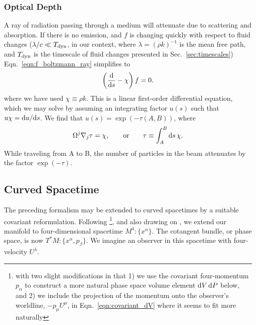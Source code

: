 \subsubsection{Optical Depth}
A ray of radiation passing through a medium will attenuate due to scattering and
absorption. If there is no emission, and $f$ is changing quickly with respect to
fluid changes ($\lambda/c \ll T_{\rm dyn}$, in our context, where
$\lambda=(\rho k)^{-1}$ is the mean free path, and $T_{\rm dyn}$ is the timescale
of fluid changes presented in Sec.~\ref{sec:timescales})
Eqn.~\ref{eqn:f_boltzmann_ray} simplifies to
\begin{equation}
  \left(\frac{\mathrm{d}}{\mathrm{d} s} - \chi\right)f=0.
\end{equation}
where we have used $\chi\equiv\rho k$.
This is a linear first-order differential equation, which we may solve by
assuming an integrating factor $u(s)$ such that $u\chi=\mathrm{d} u/\mathrm{d} s$.
We find that $u(s)=\exp\left(-\tau(A,B)\right)$, where
\begin{equation}
  \label{eqn:tau_flatspace}
  \Omega^j\nabla_j \tau = \chi, \qquad {\rm or} \qquad
  \tau \equiv \int_A^B \mathrm{d} s\, \chi.
\end{equation}
While traveling from A to B, the number of particles in the beam attenuates by
the factor $\exp(-\tau)$.

\subsection{Curved Spacetime}
The preceding formalism may be extended to curved spacetimes by a suitable
covariant reformulation. Following \citet{lind1966-gr_boltzmann}\footnote{with
two slight modifications in that 1) we use the covariant four-momentum $p_\alpha$
to construct a more natural phase space volume element $\mathrm{d} V\,\mathrm{d} P$ below,
and 2) we include the projection of the momentum onto the observer's worldline,
$-p_\mu U^\mu$, in Eqn.~\ref{eqn:covariant_dV} where it seems to fit more
naturally},
and also drawing on \citet{ipse1968-gr_boltzmann},
we extend our manifold to four-dimensional spacetime
$M^4:\{x^\alpha\}$. The cotangent bundle, or phase space, is now
$T^*M:\{x^\alpha,p_\beta\}$.
We imagine an observer in this spacetime with four-velocity $U^\lambda$.

